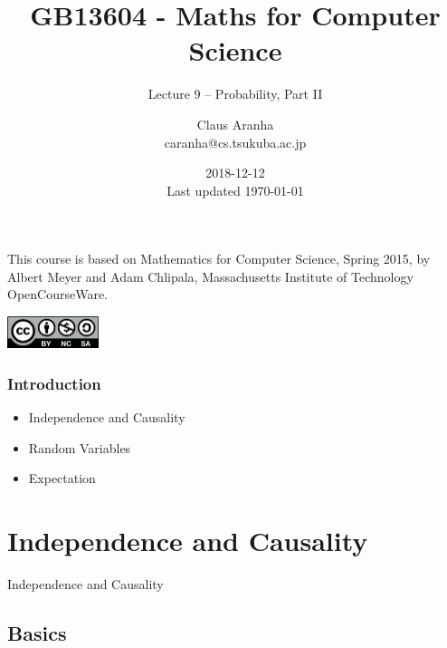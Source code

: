 \documentclass{beamer}
\title[GB13604]{GB13604 - Maths for Computer Science}
\subtitle[]{Lecture 9 -- Probability, Part II}
\author[Claus Aranha]{Claus Aranha\\{\footnotesize caranha@cs.tsukuba.ac.jp}}
\institute[COINS]{College of Information Science}
\date[2018-12-12]{2018-12-12\\{\tiny Last updated \today}}
\begin{document}
\begin{frame}
  \maketitle

  \begin{center}
    {\smaller This course is based on Mathematics for Computer Science, Spring
    2015, by Albert Meyer and Adam Chlipala, Massachusetts Institute
    of Technology OpenCourseWare.}
    
    \includegraphics[width=0.2\textwidth]{../img/by-nc-sa}
  \end{center}
\end{frame}

\begin{frame}
  \frametitle{Introduction}
  \begin{itemize}
  \item Independence and Causality
  \item Random Variables
  \item Expectation
  \end{itemize}
\end{frame}

\section{Independence and Causality}

\begin{frame}

  \begin{center}
    {\huge
      Independence and Causality
    }
  \end{center}
\end{frame}

\subsection{Basics}
\end{document}
